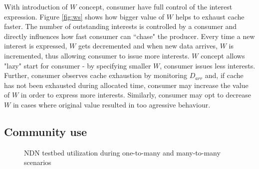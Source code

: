 \documentclass{icn/sig-alternate-2012} %
\begin{document}
With introduction of $W$ concept, consumer have full control of the interest expression. Figure \ref{fig:ws} shows how bigger value of $W$ helps to exhaust cache faster. The number of outstanding interests is controlled by a consumer and directly influences how fast consumer can ``chase" the producer. Every time a new interest is expressed, $W$ gets decremented and when new data arrives, $W$ is incremented, thus allowing consumer to issue more interests. $W$ concept allows "lazy" start for consumer - by specifying smaller $W$, consumer issues less interests. Further, consumer observes cache exhaustion by monitoring $D_{arr}$ and, if cache has not been exhausted during allocated time, consumer may increase the value of $W$ in order to express more interests. Similarly, consumer may opt to decrease $W$ in cases where original value resulted in too agressive behaviour.






\subsection{Community use}

\begin{figure}[t!]
\centering


\caption{NDN testbed utilization during one-to-many and many-to-many scenarios}
\label{fig:testbed-utilization}
\end{figure}
\end{document}
